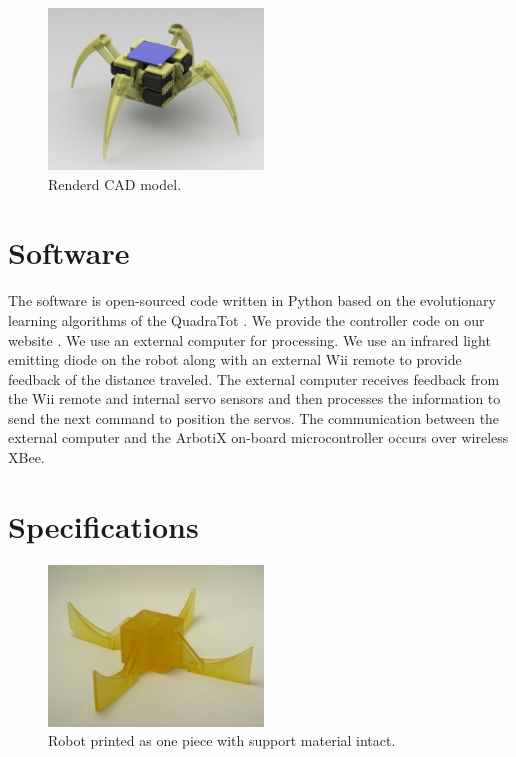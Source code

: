 \documentclass[letterpaper]{article}
\begin{document}
\begin{figure}[t]
\begin{center}
\includegraphics[width=2.25in,angle=0]{fig5.jpg}
\caption{Renderd CAD model.}
\label{fi52}
\end{center}
\end{figure}



\section{Software}

The software is open-sourced code written in Python based on the
evolutionary learning algorithms of the QuadraTot \citep{JY}. We
provide the controller code on our website \citep{WEB}. We use an
external computer for processing. We use an infrared light emitting
diode on the robot along with an external Wii remote to provide
feedback of the distance traveled. The external computer receives
feedback from the Wii remote and internal servo sensors and then
processes the information to send the next command to position the
servos. The communication between the external computer and the
ArbotiX on-board microcontroller occurs over wireless XBee.



\section{Specifications}

\begin{figure}[t]
\begin{center}
\includegraphics[width=2.25in,angle=0]{fig2.jpg}
\caption{Robot printed as one piece with support material intact.}
\label{fig2}
\end{center}
\end{figure}
\end{document}
